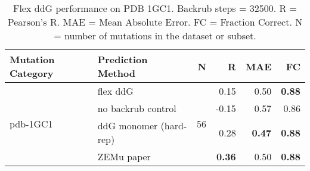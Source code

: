 \begin{table}
  \begin{tabular}{llrrrr}
\toprule
Mutation Category &       Prediction Method &   N &     R &  MAE &   FC \\
\midrule
 \multirow{ 4}{*}{pdb-1GC1} & flex ddG & \multirow{ 4}{*}{56} & 0.15 & 0.50 & \textbf{0.88}  \\
 & no backrub control & & -0.15 & 0.57 & 0.86  \\
 & ddG monomer (hard-rep) & & 0.28 & \textbf{0.47} & \textbf{0.88}  \\
 & ZEMu paper & & \textbf{0.36} & 0.50 & \textbf{0.88}  \\
\bottomrule
\end{tabular}
  \caption[Flex ddG performance on PDB 1GC1]{
    Flex ddG performance on PDB 1GC1. Backrub steps = 32500. R = Pearson's R. MAE = Mean Absolute Error. FC = Fraction Correct. N = number of mutations in the dataset or subset.
  } \label{tab:table-pdb-1GC1}
\end{table}
